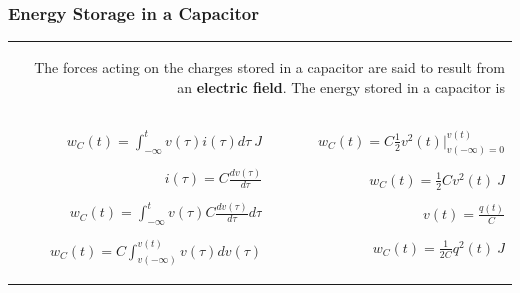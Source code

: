 \documentclass[aspectratio=169]{beamer}
\begin{document}
\begin{frame}[fragile]
\frametitle{Energy Storage in a Capacitor}
	
	
	\begin{tabular}{r}

	\begin{columns}
		\begin{column}{1\textwidth}
		The forces acting on the charges stored in a capacitor are said to result from an \textbf{electric field}. 
		The energy stored in a capacitor is 
		\end{column}
	  \end{columns}\\

	  \begin{columns}
		  \begin{column}{.5\textwidth}  %
\large 				\begin{flushleft} 
					$w_{C}(t)=\int_{-\infty}^{t} v(\tau)i(\tau) d\tau \ J$ 
					\end{flushleft}
\scriptsize				\begin{flushleft} 
					$i(\tau)=C \frac{dv(\tau)}{d \tau}$
					\end{flushleft}			
					\begin{flushleft} 
					$w_{C}(t)=\int_{-\infty}^{t} v(\tau)C \frac{dv(\tau)}{d \tau} d\tau$
					\end{flushleft}
					\begin{flushleft} 
					$w_{C}(t)=C\int_{v(-\infty)}^{v(t)} v(\tau) dv(\tau) $
					\end{flushleft}

		\end{column}
		
		  \begin{column}{.4\textwidth}  %
\scriptsize		   		\begin{flushleft} 
					$w_{C}(t)=C\frac{1}{2}v^2(t) \Big|_{v(-\infty)=0}^{v(t)} $
					\end{flushleft}
					
\large 				\begin{flushleft} 			 
					$w_{C}(t)=\frac{1}{2}Cv^2(t) \ J$
					\end{flushleft}
		   			
\scriptsize		   		\begin{flushleft} 
					$v(t)=\frac{q(t)}{C}$  
					\end{flushleft}
					
\large 				\begin{flushleft}
					 $w_{C}(t)=\frac{1}{2C}q^2(t) \ J$
					\end{flushleft}
 


\end{column}
\end{columns}
\end{tabular}
\end{frame}
\end{document}
